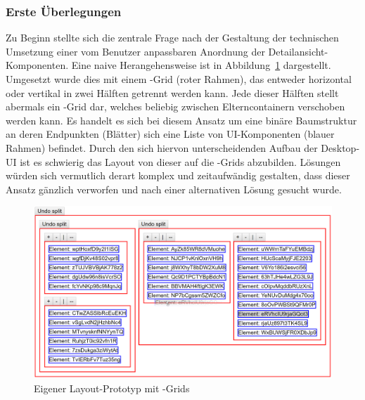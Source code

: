 \subsubsection{Erste Überlegungen}
Zu Beginn stellte sich die zentrale Frage nach der Gestaltung der technischen Umsetzung einer vom Benutzer anpassbaren Anordnung der Detailansicht-Komponenten. Eine naive Herangehensweise ist in Abbildung~\ref{fig:layout_grid_test} dargestellt. Umgesetzt wurde dies mit einem -Grid (roter Rahmen), das entweder horizontal oder vertikal in zwei Hälften getrennt werden kann. Jede dieser Hälften stellt abermals ein -Grid dar, welches beliebig zwischen Elterncontainern verschoben werden kann. Es handelt es sich bei diesem Ansatz um eine binäre Baumstruktur an deren Endpunkten (Blätter) sich eine Liste von UI-Komponenten (blauer Rahmen) befindet. Durch den sich hiervon unterscheidenden Aufbau der Desktop-UI ist es schwierig das Layout von dieser auf die -Grids abzubilden. Lösungen würden sich vermutlich derart komplex und zeitaufwändig gestalten, dass dieser Ansatz gänzlich verworfen und nach einer alternativen Lösung gesucht wurde.

\begin{figure}
    \centering
    \captionsetup{justification=centering}
    \includegraphics[width=\textwidth]{figures/layout_grid_test.png}
        \caption{Eigener Layout-Prototyp mit -Grids}\label{fig:layout_grid_test}
\end{figure}

